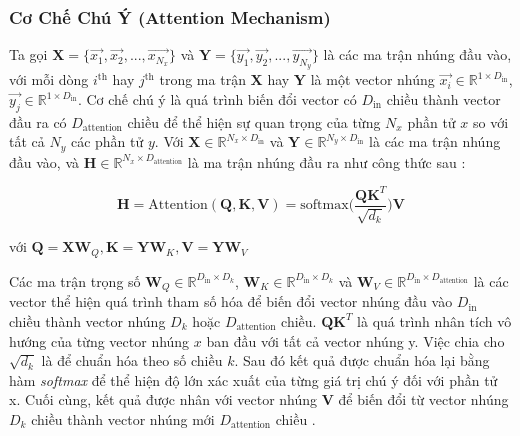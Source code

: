\subsubsection{Cơ Chế Chú Ý (Attention Mechanism)}
\label{sec:attentionMechanism}

Ta gọi $\mathbf{X} = \Big\{\overrightarrow{x_1}, \overrightarrow{x_2}, ...,  \overrightarrow{x_{N_x}}\Big\}$ và $\mathbf{Y} = \Big\{\overrightarrow{y_1}, \overrightarrow{y_2}, ...,  \overrightarrow{y_{N_y}}\Big\}$ là các ma trận nhúng đầu vào, với mỗi dòng $i^{\text{th}}$ hay $j^{\text{th}}$ trong ma trận $\mathbf{X}$ hay $\mathbf{Y}$ là một vector nhúng $\overrightarrow{x_i} \in \mathbb{R}^{1 \times D_{\text{in}}}$, $\overrightarrow{y_j} \in \mathbb{R}^{1 \times D_{\text{in}}}$.
Cơ chế chú ý là quá trình biến đổi vector có $D_{\text{in}}$ chiều thành vector đầu ra có $D_{\text{attention}}$ chiều để thể hiện sự quan trọng của từng $N_x$ phần tử $x$ so với tất cả $N_y$ các phần tử $y$. Với $\mathbf{X} \in \mathbb{R}^{N_x \times D_\text{in}}$ và $\mathbf{Y} \in \mathbb{R}^{N_y \times D_\text{in}}$ là các ma trận nhúng đầu vào, và $\mathbf{H} \in \mathbb{R}^{N_x \times D_\text{attention}}$ là ma trận nhúng đầu ra như công thức sau :

\begin{equation}
\label{attention}
\mathbf{H} = \text{Attention}(\mathbf{Q}, \mathbf{K}, \mathbf{V}) = \text{softmax}\Big(\frac{\mathbf{Q}\mathbf{K}^T}{\sqrt{d_k}}\Big) \mathbf{V}
\end{equation}

với  $\mathbf{Q} = \mathbf{X}\mathbf{W}_Q, \mathbf{K} = \mathbf{Y} \mathbf{W}_K, \mathbf{V} = \mathbf{Y} \mathbf{W}_V$

Các ma trận trọng số 
$\mathbf{W}_Q \in \mathbb{R}^{D_{\text{in}} \times D_{k}}$, 
$\mathbf{W}_K \in \mathbb{R}^{D_{\text{in}} \times D_{k}}$ và 
$\mathbf{W}_V \in \mathbb{R}^{D_{\text{in}} \times D_{\text{attention}}}$ là các vector thể hiện quá trình tham số hóa để biến đổi vector nhúng đầu vào $D_{\text{in}}$ chiều thành vector nhúng $D_{k}$ hoặc $D_{\text{attention}}$ chiều. $\mathbf{Q}\mathbf{K}^T$ là quá trình nhân tích vô hướng của từng vector nhúng $x$ ban đầu với tất cả vector nhúng y. Việc chia cho $\sqrt{d_k}$ là để chuẩn hóa theo số chiều $k$. Sau đó kết quả được chuẩn hóa lại bằng hàm \textit{softmax} để thể hiện độ lớn xác xuất của từng giá trị chú ý đối với phần tử x. Cuối cùng, kết quả được nhân với vector nhúng $\mathbf{V}$ để biến đổi từ vector nhúng $D_{k}$ chiều thành vector nhúng mới  $D_{\text{attention}}$ chiều .

